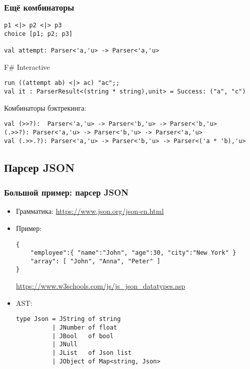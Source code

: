 \documentclass[xetex,mathserif,serif]{beamer}
\newcommand{\attribution}[1] {
    \begin{flushright}\begin{scriptsize}\textcolor{gray}{#1}\end{scriptsize}\end{flushright}
}
\begin{document}
    \begin{frame}[fragile]
        \frametitle{Ещё комбинаторы}
        \begin{verbatim}
p1 <|> p2 <|> p3
choice [p1; p2; p3]

val attempt: Parser<'a,'u> -> Parser<'a,'u>
        \end{verbatim}
        \begin{alertblock}{F\# Interactive}
            \begin{verbatim}
run ((attempt ab) <|> ac) "ac";;
val it : ParserResult<(string * string),unit> = Success: ("a", "c")
            \end{verbatim}
        \end{alertblock}
        Комбинаторы бэктрекинга:
        \begin{verbatim}
val (>>?):  Parser<'a,'u> -> Parser<'b,'u> -> Parser<'b,'u>
(.>>?): Parser<'a,'u> -> Parser<'b,'u> -> Parser<'a,'u>
val (.>>.?): Parser<'a,'u> -> Parser<'b,'u> -> Parser<('a * 'b),'u>
        \end{verbatim}
    \end{frame}

    \subsection{Парсер JSON}

    \begin{frame}[fragile]
        \frametitle{Большой пример: парсер JSON}
        \begin{itemize}
            \item Грамматика: \url{https://www.json.org/json-en.html}
            \item Пример:
                \begin{verbatim}
{
    "employee":{ "name":"John", "age":30, "city":"New York" }
    "array": [ "John", "Anna", "Peter" ]
}
                \end{verbatim}
                \attribution{\url{https://www.w3schools.com/js/js_json_datatypes.asp}}
            \item AST:
                \begin{verbatim}
type Json = JString of string
          | JNumber of float
          | JBool   of bool
          | JNull
          | JList   of Json list
          | JObject of Map<string, Json>
                \end{verbatim}
        \end{itemize}
    \end{frame}
\end{document}
